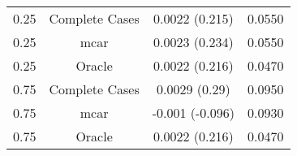 \begin{table}[ht]
\centering
\begin{tabular}{cccc}
  \hline
  \hline
0.25 & Complete Cases & 0.0022 (0.215) & 0.0550 \\ 
  0.25 & mcar & 0.0023 (0.234) & 0.0550 \\ 
  0.25 & Oracle & 0.0022 (0.216) & 0.0470 \\ 
  0.75 & Complete Cases & 0.0029 (0.29) & 0.0950 \\ 
  0.75 & mcar & -0.001 (-0.096) & 0.0930 \\ 
  0.75 & Oracle & 0.0022 (0.216) & 0.0470 \\ 
   \hline
\end{tabular}
\end{table}

